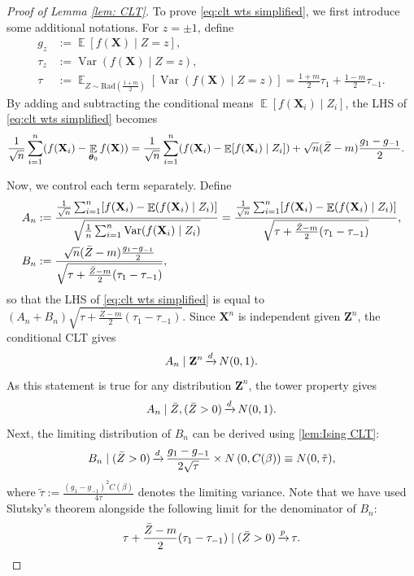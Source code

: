 \documentclass[preprint,reqno]{imsart}
\newcommand{\ttheta}{\boldsymbol{\theta}}
\DeclareMathOperator{\xp}{\xrightarrow{\mathnormal p}}
\DeclareMathOperator{\xd}{\xrightarrow{\mathnormal d}}
\DeclareMathOperator{\EE}{\mathbb{E}}
\DeclareMathOperator{\Var}{Var}
\newcommand{\Z}{\mathbf{Z}}
\newcommand{\X}{\mathbf{X}}
\DeclareMathOperator{\sumin}{\sum_{\mathnormal i=1}^{\mathnormal n}}
\begin{document}
\begin{appendix}
\begin{proof}[Proof of Lemma \ref{lem: CLT}]
To prove \eqref{eq:clt wts simplified}, we first introduce some additional notations. For $z = \pm 1$, define
\begin{align*}
    g_z &:= \EE [f(\X) \mid Z=z], \\
    \tau_z &:= \Var(f(\X) \mid Z = z), \\
    \tau &:= \EE_{Z \sim \text{Rad}(\frac{1+m}{2})} [\Var(f(\X) \mid Z = z)] = \frac{1+m}{2} \tau_1 + \frac{1-m}{2} {\tau_{-1}}.
\end{align*}
By adding and subtracting the conditional means $\EE[f(\X_i) \mid Z_i]$, the LHS of \eqref{eq:clt wts simplified} becomes
    \begin{equation}\label{eq:-f_n(theta)}
    \begin{aligned}
        \frac{1}{\sqrt{n}} \sumin (f(\X_i) - \EE_{\ttheta_0} f(\X)) &= {\frac{1}{\sqrt{n}} \sumin (f(\X_i) - \EE [f(\X_i) \mid Z_i ])}  + \sqrt{n} (\bar{Z} - m) \frac{g_1 - g_{-1}}{2}.
    \end{aligned}
    \end{equation}
    
    Now, we control each term separately.    
    Define
    \begin{align*}
        A_n &:= \frac{ \frac{1}{\sqrt{n}} \sumin [f(\X_i) - \EE (f(\X_i) \mid Z_i )] }{\sqrt{\frac{1}{n} \sumin \Var(f(\X_i) \mid Z_i)}} = \frac{ \frac{1}{\sqrt{n}} \sumin [f(\X_i) - \EE (f(\X_i) \mid Z_i )] }{\sqrt{\tau + \frac{\bar{Z}-m}{2} (\tau_1 - \tau_{-1})}}, \\
        B_n &:= \frac{\sqrt{n} (\bar{Z} - m) \frac{g_1 - g_{-1}}{2}}{\sqrt{\tau + \frac{\bar{Z}-m}{2} (\tau_1 - \tau_{-1})}},
    \end{align*}
    so that the LHS of \eqref{eq:clt wts simplified} is equal to $(A_n + B_n) \sqrt{\tau + \frac{\bar{Z}-m}{2} (\tau_1 - \tau_{-1})}$.
    Since $\X^n$ is independent given $\Z^n$, the conditional CLT gives
    $$A_n \mid \Z^n \xd N(0,1).$$
    As this statement is true for any distribution $\Z^n$, the tower property gives
    \begin{equation*}%
        A_n \mid \bar{Z}, (\bar{Z} > 0) \xd N(0,1).
    \end{equation*}
    Next, the limiting distribution of $B_n$ can be derived using \cref{lem:Ising CLT}:
    \begin{equation*}%
        B_n \mid (\bar{Z} > 0) \xd \frac{g_1 - g_{-1}}{2 \sqrt{\tau}} \times N \left(0, C(\beta) \right) \equiv N(0, \tilde{\tau}),
    \end{equation*}
    where $\tilde{\tau} := \frac{(g_1 - g_{-1})^2 C(\beta)}{4 \tau}$ denotes the limiting variance. Note that we have used Slutsky's theorem alongside the following limit for the denominator of $B_n$:
    $$\tau + \frac{\bar{Z}-m}{2} (\tau_1 - \tau_{-1}) \mid (\bar{Z} > 0) \xp \tau.$$


\end{proof}
\end{appendix}
\end{document}

